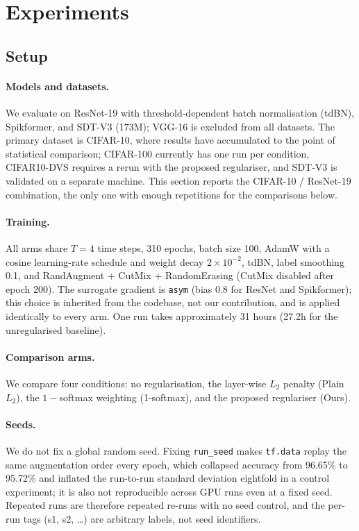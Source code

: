 \section{Experiments}
\label{sec:experiments}

\subsection{Setup}
\label{sec:exp-setup}

\paragraph{Models and datasets.} We evaluate on ResNet-19 with
threshold-dependent batch normalisation (tdBN), Spikformer, and SDT-V3
(173M); VGG-16 is excluded from all datasets. The primary dataset is
CIFAR-10, where results have accumulated to the point of statistical
comparison; CIFAR-100 currently has one run per condition, CIFAR10-DVS
requires a rerun with the proposed regulariser, and SDT-V3 is validated on a
separate machine. This section reports the CIFAR-10 / ResNet-19 combination,
the only one with enough repetitions for the comparisons below.

\paragraph{Training.} All arms share $T{=}4$ time steps, 310 epochs, batch
size 100, AdamW with a cosine learning-rate schedule and weight decay
$2\times10^{-2}$, tdBN, label smoothing 0.1, and RandAugment + CutMix +
RandomErasing (CutMix disabled after epoch 200). The surrogate gradient is
\texttt{asym} (bias 0.8 for ResNet and Spikformer); this choice
is inherited from the codebase, not our contribution, and is applied
identically to every arm. One run takes approximately 31 hours (27.2h for
the unregularised baseline).

\paragraph{Comparison arms.} We compare four conditions: no regularisation,
the layer-wise $L_2$ penalty (Plain $L_2$), the $1{-}$softmax weighting
(1-softmax), and the proposed regulariser (Ours).

\paragraph{Seeds.} We do not fix a global random seed. Fixing
\texttt{run\_seed} makes \texttt{tf.data} replay the same augmentation order
every epoch, which collapsed accuracy from 96.65\% to 95.72\% and inflated
the run-to-run standard deviation eightfold in a control experiment; it is
also not reproducible across GPU runs even at a fixed seed. Repeated runs
are therefore repeated re-runs with no seed control, and the per-run tags
(s1, s2, \ldots) are arbitrary labels, not seed identifiers.

